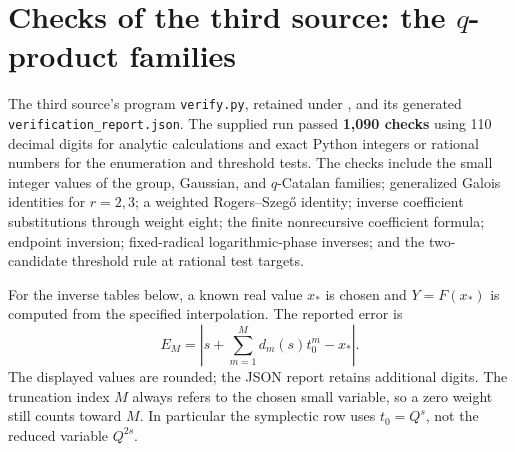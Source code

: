 \documentclass[11pt,openany]{book}
\numberwithin{equation}{chapter}
\theoremstyle{plain}
\theoremstyle{definition}
\theoremstyle{remark}
\begin{document}
\section{Checks of the third source: the $q$-product families}
\label{ct:sec:numerics-t3}

\label{t3:sec:numerics}

The third source's program \texttt{verify.py}, retained under , and its generated
\texttt{verification\_report.json}. The supplied run passed \textbf{1,090 checks} using 110 decimal digits for analytic calculations and exact Python integers or rational numbers for the enumeration and threshold tests. The checks include the small integer values of the group, Gaussian, and $q$-Catalan families; generalized Galois identities for $r=2,3$; a weighted Rogers--Szeg\H{o} identity; inverse coefficient substitutions through weight eight; the finite nonrecursive coefficient formula; endpoint inversion; fixed-radical logarithmic-phase inverses; and the two-candidate threshold rule at rational test targets.

For the inverse tables below, a known real value $x_*$ is chosen and
$Y=F(x_*)$ is computed from the specified interpolation. The reported error is
\begin{equation}\label{t3:eq:tableerror}
 E_M=\left|s+\sum_{m=1}^M d_m(s)t_0^m-x_*\right|.
\end{equation}
The displayed values are rounded; the JSON report retains additional digits. The truncation index $M$ always refers to the chosen small variable, so a zero weight still counts toward $M$. In particular the symplectic row uses $t_0=Q^s$, not the reduced variable $Q^{2s}$.
\end{document}
